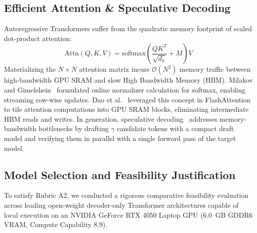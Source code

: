 \documentclass[conference]{IEEEtran}
\begin{document}
\subsection{Efficient Attention \& Speculative Decoding}
Autoregressive Transformers suffer from the quadratic memory footprint of scaled dot-product attention:
\begin{equation}
    \text{Attn}(Q, K, V) = \text{softmax}\left(\frac{Q K^T}{\sqrt{d_k}} + M\right) V
\end{equation}
Materializing the $N \times N$ attention matrix incurs $\mathcal{O}(N^2)$ memory traffic between high-bandwidth GPU SRAM and slow High Bandwidth Memory (HBM). Milakov and Gimelshein~\cite{milakov2018online} formulated online normalizer calculation for softmax, enabling streaming row-wise updates. Dao et al.~\cite{dao2022flashattention,dao2023flashattention2} leveraged this concept in FlashAttention to tile attention computations into GPU SRAM blocks, eliminating intermediate HBM reads and writes. In generation, speculative decoding~\cite{leviathan2023fast,chen2023accelerating} addresses memory-bandwidth bottlenecks by drafting $\gamma$ candidate tokens with a compact draft model and verifying them in parallel with a single forward pass of the target model.

\subsection{Model Selection and Feasibility Justification}
To satisfy Rubric A2, we conducted a rigorous comparative feasibility evaluation across leading open-weight decoder-only Transformer architectures capable of local execution on an NVIDIA GeForce RTX 4050 Laptop GPU (6.0~GB GDDR6 VRAM, Compute Capability 8.9).
\end{document}
